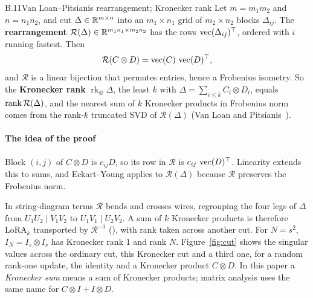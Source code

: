 
\begin{bgfact}{B.11}{Van Loan--Pitsianis rearrangement; Kronecker rank}
Let $m=m_1m_2$ and $n=n_1n_2$, and cut $\Delta\in\mathbb{R}^{m\times n}$ into an $m_1\times n_1$ grid of $m_2\times n_2$ blocks
$\Delta_{ij}$. The \textbf{rearrangement} $\mathcal R(\Delta)\in\mathbb{R}^{m_1n_1\times m_2n_2}$ has the rows
$\operatorname{vec}(\Delta_{ij})^{\top}$, ordered with $i$ running fastest. Then
\begin{equation*}
  \mathcal R(C\otimes D)=\operatorname{vec}(C)\,\operatorname{vec}(D)^{\top},
\end{equation*}
and $\mathcal R$ is a linear bijection that permutes entries, hence a Frobenius isometry. So the \textbf{Kronecker rank}
$\operatorname{rk}_\otimes\Delta$, the least $k$ with $\Delta=\sum_{i\le k}C_i\otimes D_i$, equals
$\operatorname{rank}\mathcal R(\Delta)$, and the nearest sum of $k$ Kronecker products in Frobenius norm comes from the rank-$k$
truncated SVD of $\mathcal R(\Delta)$ (Van Loan and Pitsianis~\citeyear{loan1993approximation}).
\end{bgfact}

\paragraph{The idea of the proof}
Block $(i,j)$ of $C\otimes D$ is $c_{ij}D$, so its row in $\mathcal R$ is $c_{ij}\,\operatorname{vec}(D)^{\top}$. Linearity extends this
to sums, and Eckart--Young applies to $\mathcal R(\Delta)$ because $\mathcal R$ preserves the Frobenius norm.

\medskip\noindent
In string-diagram terms $\mathcal R$ bends and crosses wires, regrouping the four legs of $\Delta$ from
$U_1U_2\mid V_1V_2$ to $U_1V_1\mid U_2V_2$. A sum of $k$ Kronecker products is therefore $\mathrm{LoRA}_k$ transported by
$\mathcal R^{-1}$ (), with rank taken across another cut. For $N=s^2$, $I_N=I_s\otimes I_s$
has Kronecker rank $1$ and rank $N$. Figure~\ref{fig:cut} shows the singular values across the ordinary cut, this
Kronecker cut and a third one, for a random rank-one update, the identity and a Kronecker product $C\otimes D$. In this
paper a \emph{Kronecker sum} means a sum of Kronecker products; matrix analysis uses the same name for
$C\otimes I+I\otimes D$.


